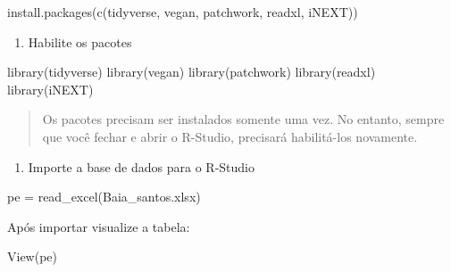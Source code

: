 \documentclass[
]{book}
\newenvironment{Shaded}{\begin{snugshade}}{\end{snugshade}}
\newcommand{\FunctionTok}[1]{\textcolor[rgb]{0.00,0.00,0.00}{#1}}
\newcommand{\NormalTok}[1]{#1}
\newcommand{\OtherTok}[1]{\textcolor[rgb]{0.56,0.35,0.01}{#1}}
\newcommand{\StringTok}[1]{\textcolor[rgb]{0.31,0.60,0.02}{#1}}
\providecommand{\tightlist}{%
  \setlength{\itemsep}{0pt}\setlength{\parskip}{0pt}}
\begin{document}
\begin{Shaded}
\begin{Highlighting}[]
\FunctionTok{install.packages}\NormalTok{(}\FunctionTok{c}\NormalTok{(}\StringTok{\textquotesingle{}tidyverse\textquotesingle{}}\NormalTok{, }\StringTok{\textquotesingle{}vegan\textquotesingle{}}\NormalTok{, }\StringTok{\textquotesingle{}patchwork\textquotesingle{}}\NormalTok{, }\StringTok{\textquotesingle{}readxl\textquotesingle{}}\NormalTok{, }\StringTok{\textquotesingle{}iNEXT\textquotesingle{}}\NormalTok{))}
\end{Highlighting}
\end{Shaded}

\begin{enumerate}
\def\labelenumi{\arabic{enumi}.}
\setcounter{enumi}{3}
\tightlist
\item
  Habilite os pacotes
\end{enumerate}

\begin{Shaded}
\begin{Highlighting}[]
\FunctionTok{library}\NormalTok{(tidyverse)}
\FunctionTok{library}\NormalTok{(vegan)}
\FunctionTok{library}\NormalTok{(patchwork)}
\FunctionTok{library}\NormalTok{(readxl)}
\FunctionTok{library}\NormalTok{(iNEXT)}
\end{Highlighting}
\end{Shaded}

\begin{quote}
Os pacotes precisam ser instalados somente uma vez. No entanto, sempre que você fechar e abrir o R-Studio, precisará habilitá-los novamente.
\end{quote}

\begin{enumerate}
\def\labelenumi{\arabic{enumi}.}
\setcounter{enumi}{4}
\tightlist
\item
  Importe a base de dados para o R-Studio
\end{enumerate}

\begin{Shaded}
\begin{Highlighting}[]
\NormalTok{pe }\OtherTok{=} \FunctionTok{read\_excel}\NormalTok{(}\StringTok{\textquotesingle{}Baia\_santos.xlsx\textquotesingle{}}\NormalTok{)}
\end{Highlighting}
\end{Shaded}

Após importar visualize a tabela:

\begin{Shaded}
\begin{Highlighting}[]
\FunctionTok{View}\NormalTok{(pe)}
\end{Highlighting}
\end{Shaded}
\end{document}
